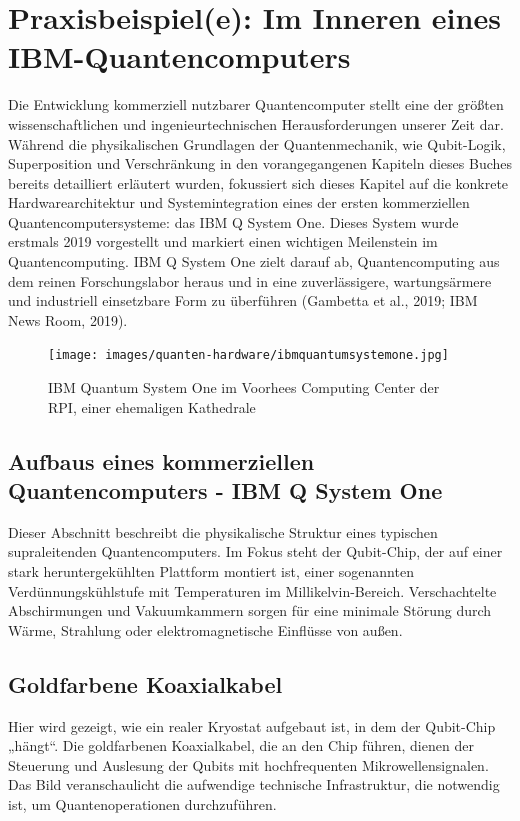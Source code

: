 \section{Praxisbeispiel(e): Im Inneren eines IBM-Quantencomputers}
Die Entwicklung kommerziell nutzbarer Quantencomputer stellt eine der größten wissenschaftlichen und ingenieurtechnischen Herausforderungen unserer Zeit dar. Während die physikalischen Grundlagen der Quantenmechanik, wie Qubit-Logik, Superposition und Verschränkung in den vorangegangenen Kapiteln dieses Buches bereits detailliert erläutert wurden, fokussiert sich dieses Kapitel auf die konkrete Hardwarearchitektur und Systemintegration eines der ersten kommerziellen Quantencomputersysteme: das IBM Q System One. Dieses System wurde erstmals 2019 vorgestellt und markiert einen wichtigen Meilenstein im Quantencomputing. IBM Q System One zielt darauf ab, Quantencomputing aus dem reinen Forschungslabor heraus und in eine zuverlässigere, wartungsärmere und industriell einsetzbare Form zu überführen (Gambetta et al., 2019; IBM News Room, 2019).

\begin{figure}[H]
    \centering
    \texttt{[image: images/quanten-hardware/ibmquantumsystemone.jpg]}
    \caption{IBM Quantum System One im Voorhees Computing Center der RPI, einer ehemaligen Kathedrale}
    \label{fig:ibmquantumsystemone}
\end{figure}

\subsection{Aufbaus eines kommerziellen Quantencomputers - IBM Q System One}
Dieser Abschnitt beschreibt die physikalische Struktur eines typischen supraleitenden Quantencomputers. Im Fokus steht der Qubit-Chip, der auf einer stark heruntergekühlten Plattform montiert ist, einer sogenannten Verdünnungskühlstufe mit Temperaturen im Millikelvin-Bereich. Verschachtelte Abschirmungen und Vakuumkammern sorgen für eine minimale Störung durch Wärme, Strahlung oder elektromagnetische Einflüsse von außen.


\subsection{Goldfarbene Koaxialkabel}
Hier wird gezeigt, wie ein realer Kryostat aufgebaut ist, in dem der Qubit-Chip „hängt“. Die goldfarbenen Koaxialkabel, die an den Chip führen, dienen der Steuerung und Auslesung der Qubits mit hochfrequenten Mikrowellensignalen. Das Bild veranschaulicht die aufwendige technische Infrastruktur, die notwendig ist, um Quantenoperationen durchzuführen.

